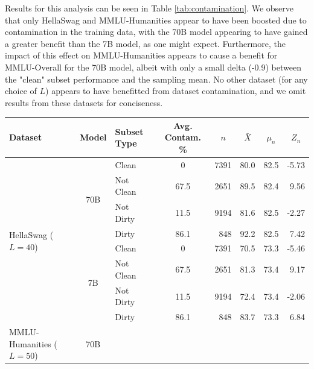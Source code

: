 \documentclass{article}
\begin{document}
Results for this analysis can be seen in Table \ref{tab:contamination}.  We observe that only HellaSwag and MMLU-Humanities appear to have been boosted due to contamination in the training data, with the 70B model appearing to have gained a greater benefit than the 7B model, as one might expect. Furthermore, the impact of this effect on MMLU-Humanities appears to cause a benefit for MMLU-Overall for the 70B model, albeit with only a small delta (-0.9) between the "clean" subset performance and the sampling mean. No other dataset (for any choice of $L$) appears to have benefitted from dataset contamination, and we omit results from these datasets for conciseness.

\begin{table}[]
\centering
\begin{tabular}{lclcrrrr}
\toprule
\textbf{Dataset}                         & \textbf{Model}           & \textbf{Subset Type} & \multicolumn{1}{c}{\textbf{Avg. Contam. \%}}  &\multicolumn{1}{c}{$n$} & \multicolumn{1}{c}{$\bar{X}$} & \multicolumn{1}{c}{$\mu_n$} & \multicolumn{1}{c}{$Z_n$}  \\ \midrule
\multirow{8}{*}{HellaSwag ($L=40$)}     & \multirow{4}{*}{70B} 
                                                    & Clean         &  0         & 7391  & 80.0         & 82.5    & -5.73 \\ 
                                &                      & Not Clean  &    67.5    & 2651  & 89.5      & 82.4    &  9.56 \\ 
                                &                      & Not Dirty  &    11.5    & 9194  & 81.6      & 82.5    & -2.27  \\ 
                                &                      & Dirty      &    86.1    &  848  & 92.2      & 82.5    &  7.42  \\ 
                                & \multirow{4}{*}{7B}  & Clean      &     0      & 7391  & 70.5      & 73.3    & -5.46  \\ 
                                &                      & Not Clean  &    67.5    & 2651  & 81.3      & 73.4    &  9.17  \\ 
                                &                      & Not Dirty  &    11.5    & 9194  & 72.4      & 73.4    & -2.06  \\ 
                                &                      & Dirty      &    86.1    &  848  & 83.7      & 73.3    &  6.84  \\
                                \midrule
\multirow{8}{*}{MMLU-Humanities ($L=50$)} & \multirow{4}{*}{70B}                                

\end{tabular}
\end{table}
\end{document}
